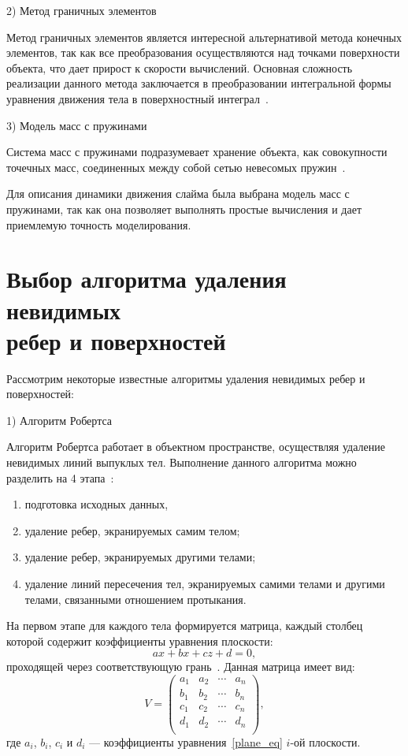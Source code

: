 2) Метод граничных элементов

Метод граничных элементов является интересной альтернативой метода
конечных элементов, так как все преобразования осуществляются над точками
поверхности объекта, что дает прирост к скорости вычислений. Основная
сложность реализации данного метода заключается в преобразовании
интегральной формы уравнения движения тела в поверхностный интеграл~\cite{muller}.

3) Модель масс с пружинами

Система масс с пружинами подразумевает хранение объекта, как совокупности точечных масс, соединенных между собой сетью невесомых пружин~\cite{muller}.

Для описания динамики движения слайма была выбрана модель масс с
пружинами, так как она позволяет выполнять простые вычисления и дает
приемлемую точность моделирования.

\section[Выбор алгоритма удаления невидимых ребер и поверхностей]{Выбор алгоритма удаления невидимых\\ребер и поверхностей}

Рассмотрим некоторые известные алгоритмы удаления невидимых ребер и поверхностей:

1) Алгоритм Робертса

Алгоритм Робертса работает в объектном пространстве, осуществляя
удаление невидимых линий выпуклых тел. Выполнение данного алгоритма можно
разделить на 4 этапа~\cite{rojers}:

\begin{enumerate}
	\item подготовка исходных данных,
	\item удаление ребер, экранируемых самим телом;
	\item удаление ребер, экранируемых другими телами;
	\item удаление линий пересечения тел, экранируемых самими телами и другими телами, связанными отношением протыкания.
\end{enumerate}

На первом этапе для каждого тела формируется матрица, каждый столбец
которой содержит коэффициенты уравнения плоскости:
\begin{equation}\label{plane_eq}
	ax + bx + cz + d = 0,
\end{equation}
проходящей через соответствующую грань~\cite{rojers}. Данная матрица имеет вид:
$$
V =
\begin{pmatrix}
	a_1 & a_2 & \cdots & a_n \\
	b_1 & b_2 & \cdots & b_n \\
	c_1 & c_2 & \cdots & c_n \\
	d_1 & d_2 & \cdots & d_n \\
\end{pmatrix},
$$
где $a_i$, $b_i$, $c_i$ и $d_i$ --- коэффициенты уравнения~\eqref{plane_eq} $i$-ой плоскости.

